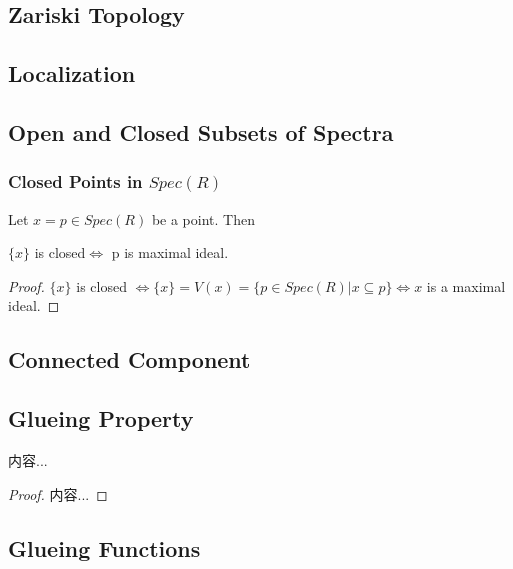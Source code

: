 \documentclass[Total.tex]{subfiles}
\begin{document}
			\subsection{Zariski Topology}
			
			\begin{Def}
				
			\end{Def}
			
			\subsection{Localization}
			\subsection{Open and Closed Subsets of Spectra}
			
			\subsubsection{Closed Points in $Spec(R)$}
			
			\begin{proposition}
				Let $x=p\in Spec(R)$ be a point. Then
				
				\begin{center}
					$\{x\}$ is closed$\Leftrightarrow$ p is maximal ideal.
				\end{center}
			\end{proposition}
			
			\begin{proof}
				$\{x\}$ is closed $\Leftrightarrow \{x\}=V(x)=\{p\in Spec(R)|x\subseteq p\}\Leftrightarrow x$ is a maximal ideal.
			\end{proof}
			
			\subsection{Connected Component}
			
			\subsection{Glueing Property}
			\begin{lemma}
				内容...
			\end{lemma}
			\begin{proof}
				内容...
			\end{proof}
			\subsection{Glueing Functions}
			
\end{document}
